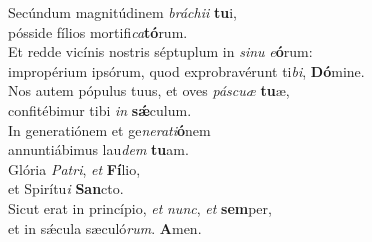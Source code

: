 \evenverse Secúndum magnitúdinem \textit{brá}\textit{chi}\textit{i} \textbf{tu}i,~\*\\
\evenverse pósside fílios mortifi\textit{ca}\textbf{tó}rum.\\
\oddverse Et redde vicínis nostris séptuplum in \textit{si}\textit{nu} \textit{e}\textbf{ó}rum:~\*\\
\oddverse impropérium ipsórum, quod exprobravérunt ti\textit{bi}, \textbf{Dó}mine.\\
\evenverse Nos autem pópulus tuus, et oves \textit{pá}\textit{scu}\textit{æ} \textbf{tu}æ,~\*\\
\evenverse confitébimur tibi \textit{in} \textbf{sǽ}culum.\\
\oddverse In generatiónem et ge\textit{ne}\textit{ra}\textit{ti}\textbf{ó}nem~\*\\
\oddverse annuntiábimus lau\textit{dem} \textbf{tu}am.\\
\evenverse Glória \textit{Pa}\textit{tri}, \textit{et} \textbf{Fí}lio,~\*\\
\evenverse et Spirítu\textit{i} \textbf{San}cto.\\
\oddverse Sicut erat in princípio, \textit{et} \textit{nunc}, \textit{et} \textbf{sem}per,~\*\\
\oddverse et in sǽcula sæculó\textit{rum}. \textbf{A}men.\\
